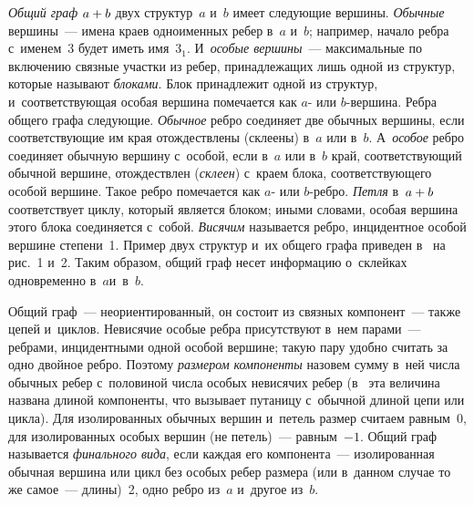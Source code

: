 \begin{multicols}{2}
  \textit{Общий граф} $a\hm+b$ двух структур~$a$ и~$b$ имеет следующие 
вершины. \textit{Обычные} вершины~--- имена краев одноименных ребер в~$a$ 
и~$b$; например, начало реб\-ра с~именем~3 будет иметь имя~3$_1$. 
И~\textit{особые вершины}~--- максимальные по включению связные участки 
из ребер, принадлежащих лишь одной из структур, которые называют 
\textit{блоками}. Блок принадлежит одной из структур, и~соответствующая 
особая вершина помечается как $a$- или $b$-вер\-ши\-на. Реб\-ра общего графа 
следующие. \textit{Обычное} реб\-ро соединяет две обычных вершины, если 
соответствующие им края отождествлены (склеены) в~$a$ или в~$b$. 
А~\textit{особое} реб\-ро соединяет обычную вершину с~особой, если в~$a$ или 
в~$b$ край, со\-от\-вет\-ст\-ву\-ющий обычной вершине, отож\-дествлен (\textit{склеен}) 
с~краем блока, со\-от\-вет\-ст\-ву\-юще\-го особой вершине. Такое реб\-ро помечается как 
$a$- или $b$-реб\-ро. \textit{Петля} в~$a\hm+b$ соответствует циклу, который 
является блоком; иными словами, особая вершина этого блока соединяется 
с~собой. \textit{Висячим} называется реб\-ро, инцидентное особой вершине 
степени~1. Пример двух структур и~их общего графа приведен в~\cite{3-gor} на 
рис.~1 и~2. Таким образом, общий граф несет информацию о~склейках 
одновременно в~$a$\linebreak и~в~$b$.
  
  Общий граф~--- неориентированный, он состоит из связных компонент~--- 
также цепей и~циклов. Невисячие особые реб\-ра присутствуют в~нем парами~--- 
реб\-ра\-ми, инцидентными одной особой вершине; такую пару удобно считать за 
одно двойное ребро. Поэтому \textit{размером компоненты} назовем сумму 
в~ней числа обычных ребер с~половиной числа особых невисячих ребер 
(в~\cite{2-gor} эта величина названа длиной компоненты, что вызывает 
путаницу с~обычной длиной цепи или цикла). Для изолированных обычных 
вершин и~петель размер считаем равным~0, для изолированных особых вершин 
(не петель)~--- равным~$-1$. Общий граф называется 
\textit{финального вида}, если каждая его компонента~--- изолированная 
обычная вершина или цикл без особых ребер размера (или в~данном случае то 
же самое~--- длины)~2, одно ребро из~$a$ и~другое из~$b$. 

\begin{figure*}[b] %
\vspace*{12pt}
\begin{center}
\mbox{%
\epsfxsize=82.146mm
}
\end{center}
\vspace*{-9pt}
\end{figure*}
  

\end{multicols}
